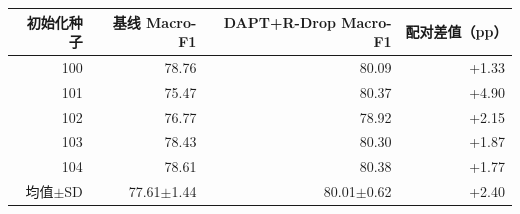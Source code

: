 \begin{tabular}{rrrr}
\toprule
初始化种子 & 基线 Macro-F1 & DAPT+R-Drop Macro-F1 & 配对差值（pp）\\
\midrule
100 & 78.76 & 80.09 & +1.33\\
101 & 75.47 & 80.37 & +4.90\\
102 & 76.77 & 78.92 & +2.15\\
103 & 78.43 & 80.30 & +1.87\\
104 & 78.61 & 80.38 & +1.77\\
\midrule
均值$\pm$SD & 77.61$\pm$1.44 & 80.01$\pm$0.62 & +2.40\\
\bottomrule
\end{tabular}
